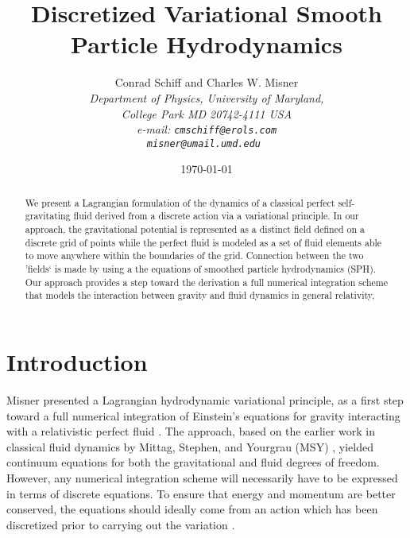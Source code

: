\documentclass{article}
\begin{document}
\title{Discretized Variational Smooth Particle Hydrodynamics}
%
\author{   \sc
             Conrad Schiff {\rm and} Charles W. Misner\\
           \em
            Department of Physics, University of Maryland,
           \\
            College Park MD 20742-4111 USA\\
           \rm
         e-mail: \tt  cmschiff@erols.com\\
                      misner@umail.umd.edu
%
}
\date{\today}
\maketitle

\begin{abstract}
We present a Lagrangian formulation of the dynamics of a classical perfect
self-gravitating fluid derived from a discrete action via a variational
principle.  In our approach, the gravitational potential is represented as a
distinct field defined on a discrete grid of points while the perfect fluid is
modeled as a set of fluid elements able to move anywhere within the boundaries
of the grid. Connection between the two 'fields` is made by using a the
equations of smoothed particle hydrodynamics (SPH).  Our approach provides a
step toward the derivation a full numerical integration scheme that models the
interaction between gravity and fluid dynamics in general relativity,
\end{abstract}

\section{Introduction}

Misner presented a Lagrangian hydrodynamic variational principle, as a first
step toward a full numerical integration of Einstein's equations for gravity
interacting with a relativistic perfect fluid \cite{A:CWM96}.  The approach,
based on the earlier work in classical fluid dynamics by Mittag, Stephen, and
Yourgrau (MSY) \cite{B:MSY79}, yielded continuum equations for both the
gravitational and fluid degrees of freedom.  However, any numerical integration
scheme will necessarily have to be expressed in terms of discrete equations.
To ensure that energy and momentum are better conserved, the equations should
ideally come from an action which has been discretized prior to carrying out
the variation \cite{A:CWM96,A:NP94}.
\end{document}
